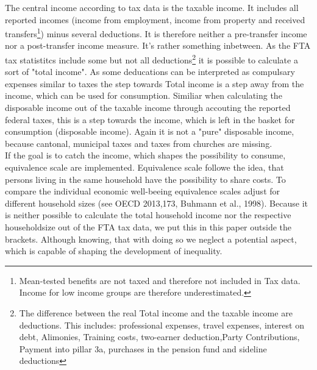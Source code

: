 \documentclass[twoside]{article}\usepackage[]{graphicx}\usepackage[]{color}
\begin{document}
\begin{multicols}{2}
The central income according to tax data is the taxable income. It includes all reported incomes (income from employment, income from property and received transfers\footnote{Mean-tested benefits are not taxed and therefore not included in Tax data. Income for low income groups are therefore underestimated.}) minus several deductions. It is therefore neither a pre-transfer income  nor a post-transfer income measure. It's rather something inbetween. As the FTA tax statistitcs include some but not all deductions\footnote{The difference between the real Total income and the taxable income are deductions. This includes: professional expenses, travel expenses, interest on debt, Alimonies, Training costs, two-earner deduction,Party Contributions, Payment into pillar 3a, purchases in the pension fund and sideline deductions} it is possible to calculate a sort of "total income". As some deducations can be interpreted as compulsary expenses similar to taxes the step towards Total income is a step away from the income, which can be used for consumption. Similiar when calculating the disposable income out of the taxable income through accouting the reported federal taxes, this is a step towards the income, which is left in the basket for consumption (disposable income). Again it is not a "pure" disposable income, because cantonal, municipal taxes and taxes from churches are missing.   \\   


If the goal is to catch the income, which shapes the possibility to consume, equivalence scale are implemented. Equivalence scale followe the idea, that persons living in the same household have the possibility to share costs. To compare the individual economic well-beeing equivalence scales adjust for different household sizes (see OECD 2013,173, Buhmann et al., 1998). Because it is neither possible to calculate the total household income nor the respective householdsize out of the FTA tax data, we put this in this paper outside the brackets. Although knowing, that with doing so we neglect a potential aspect, which is capable of shaping the development of inequality.
  

\end{multicols}
\end{document}
